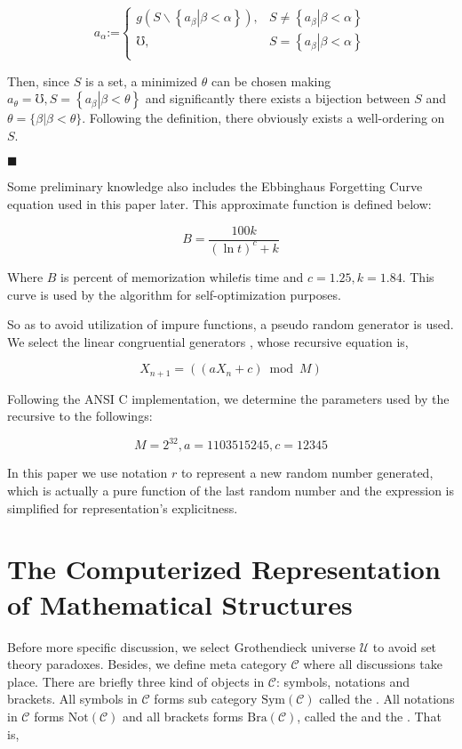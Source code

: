 \documentclass{article}
\begin{document}
\[a_{\alpha }\text{:=}\left\{
\begin{array}{cc}
 g\left(S\backslash \left\{\left.a_{\beta }\right|\beta <\alpha \right\}\right), & S\neq \left\{\left.a_{\beta }\right|\beta <\alpha \right\} \\
 \mho , & S=\left\{\left.a_{\beta }\right|\beta <\alpha \right\} \\
\end{array}
\right.\]

Then, since \(S\) is a set, a minimized \(\theta\) can be chosen making \(a_{\theta }=\mho , S=\left\{\left.a_{\beta }\right|\beta <\theta \right\}\) and significantly there exists a bijection between \(S\) and \(\theta =\{\beta |\beta <\theta \}\). Following the definition, there obviously exists a well-ordering on \(S\).
\begin{flushright}
	$\blacksquare $
\end{flushright}

Some preliminary knowledge also includes the Ebbinghaus Forgetting Curve equation \cite{4} used in this paper later. This approximate function is defined below:

\[B=\frac{100 k}{(\ln  t)^c+k}\]

Where \(B\) is percent of memorization while\(t\)is time and \(c=1.25,k=1.84\). This curve is used by the algorithm for self-optimization purposes.

So as to avoid utilization of impure functions, a pseudo random generator is used. We select the linear congruential generators \cite{5}, whose recursive equation is,

\[X_{n+1}=(\left(a X_n+c\right) \bmod M)\]

Following the ANSI C implementation, we determine the parameters used by the recursive to the followings:

\[M=2^{32},a=1103515245, c=12345\]

In this paper we use notation \(\mathit{r}\) to represent a new random number generated, which is actually a pure function of the last random number and the expression is simplified for representation{'}s explicitness.

\section*{The Computerized Representation of Mathematical Structures}

Before more specific discussion, we select Grothendieck universe \(\mathcal{U}\) \cite{1} to avoid set theory paradoxes. Besides, we define meta category \(\mathcal{C}\) where all discussions take place. There are briefly three kind of objects in \(\mathcal{C}\): symbols, notations and brackets. All symbols in \(\mathcal{C}\) forms sub category \(\text{Sym}(\mathcal{C})\) called the . All notations in \(\mathcal{C}\) forms \(\text{Not}(\mathcal{C})\) and all brackets forms \(\text{Bra}(\mathcal{C})\), called the  and the . That is,
\end{document}
